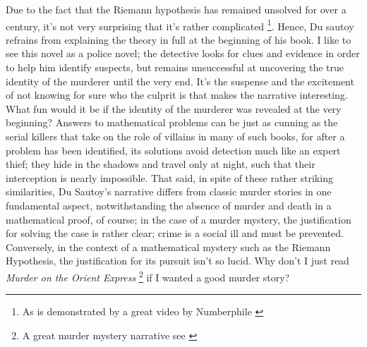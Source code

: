 \documentclass{mathbook}
\begin{document}
    Due to the fact that the Riemann hypothesis has remained unsolved for over a century, it's not very surprising that it's rather complicated \footnote{As is demonstrated by a great video by Numberphile \cite{Numberphile2014}}. Hence, Du sautoy refrains from explaining the theory in full at the beginning of his book. I like to see this novel as a police novel; the detective looks for clues and evidence in order to help him identify suspects, but remains unsuccessful at uncovering the true identity of the murderer until the very end. It's the suspense and the excitement of not knowing for sure who the culprit is that makes the narrative interesting. What fun would it be if the identity of the murderer was revealed at the very beginning? Answers to mathematical problems can be just as cunning as the serial killers that take on the role of villains in many of such books, for after a problem has been identified, its solutions avoid detection much like an expert thief; they hide in the shadows and travel only at night, such that their interception is nearly impossible. That said, in spite of these rather striking similarities, Du Sautoy's narrative differs from classic murder stories in one fundamental aspect, notwithstanding the absence of murder and death in a mathematical proof, of course; in the case of a murder mystery, the justification for solving the case is rather clear; crime is a social ill and must be prevented. Conversely, in the context of a mathematical mystery such as the Riemann Hypothesis, the justification for its pursuit isn't so lucid. Why don't I just read \emph{Murder on the Orient Express} \footnote{A great murder mystery narrative see \cite{Christie1934}} if I wanted a good murder story?
    
\end{document}
